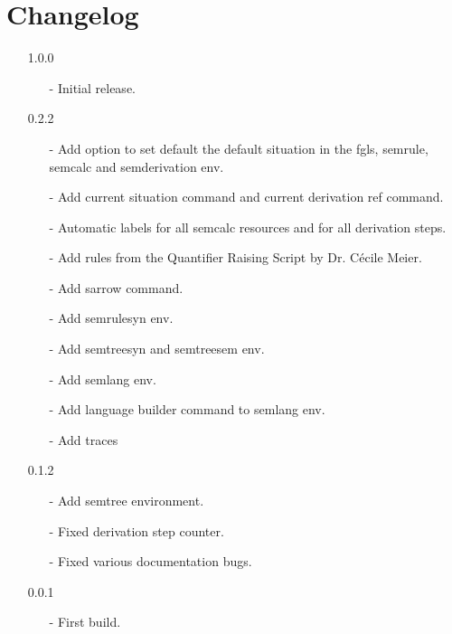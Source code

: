 \documentclass[10pt, a4paper]{article}
\begin{document}
	\section{Changelog}
	\begin{itemize}
		\item[1.0.0] 
		\begin{enumerate}
			\item[-] Initial release.
		\end{enumerate}
		\item[0.2.2] 
		\begin{enumerate}
			\item[-] Add option to set default the default situation in the fgls, semrule, semcalc and semderivation env.
			\item[-] Add current situation command and current derivation ref command.
			\item[-] Automatic labels for all semcalc resources and for all derivation steps.
			\item[-] Add rules from the Quantifier Raising Script by Dr. C\'{e}cile Meier.
			\item[-] Add sarrow command.
			\item[-] Add semrulesyn env.
			\item[-] Add semtreesyn and semtreesem env.
			\item[-] Add semlang env.
			\item[-] Add language builder command to semlang env.
			\item[-] Add traces
		\end{enumerate}
		\item[0.1.2] 
		\begin{enumerate}
			\item[-] Add semtree environment.
			\item[-] Fixed derivation step counter.
			\item[-] Fixed various documentation bugs.
		\end{enumerate}
		\item[0.0.1] 
		\begin{enumerate}
			\item[-] First build.
		\end{enumerate}
	\end{itemize}
\end{document}
